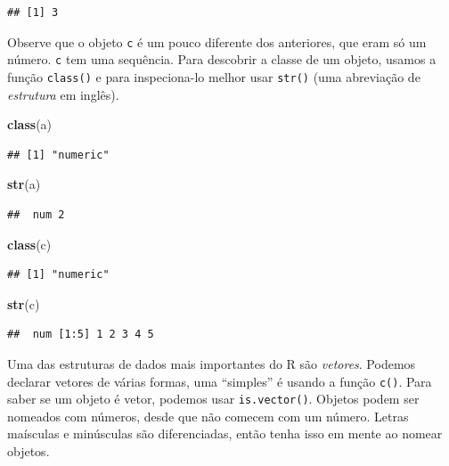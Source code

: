 \documentclass[
]{article}
\newenvironment{Shaded}{\begin{snugshade}}{\end{snugshade}}
\newcommand{\KeywordTok}[1]{\textcolor[rgb]{0.13,0.29,0.53}{\textbf{#1}}}
\newcommand{\NormalTok}[1]{#1}
\begin{document}
\begin{verbatim}
## [1] 3
\end{verbatim}

Observe que o objeto \texttt{c} é um pouco diferente dos anteriores, que
eram só um número. \texttt{c} tem uma sequência. Para descobrir a classe
de um objeto, usamos a função \texttt{class()} e para inspeciona-lo
melhor usar \texttt{str()} (uma abreviação de \emph{estrutura} em
inglês).

\begin{Shaded}
\begin{Highlighting}[]
\KeywordTok{class}\NormalTok{(a)}
\end{Highlighting}
\end{Shaded}

\begin{verbatim}
## [1] "numeric"
\end{verbatim}

\begin{Shaded}
\begin{Highlighting}[]
\KeywordTok{str}\NormalTok{(a)}
\end{Highlighting}
\end{Shaded}

\begin{verbatim}
##  num 2
\end{verbatim}

\begin{Shaded}
\begin{Highlighting}[]
\KeywordTok{class}\NormalTok{(c)}
\end{Highlighting}
\end{Shaded}

\begin{verbatim}
## [1] "numeric"
\end{verbatim}

\begin{Shaded}
\begin{Highlighting}[]
\KeywordTok{str}\NormalTok{(c)}
\end{Highlighting}
\end{Shaded}

\begin{verbatim}
##  num [1:5] 1 2 3 4 5
\end{verbatim}

Uma das estruturas de dados mais importantes do R são \emph{vetores}.
Podemos declarar vetores de várias formas, uma ``simples'' é usando a
função \texttt{c()}. Para saber se um objeto é vetor, podemos usar
\texttt{is.vector()}. Objetos podem ser nomeados com números, desde que
não comecem com um número. Letras maísculas e minúsculas são
diferenciadas, então tenha isso em mente ao nomear objetos.
\end{document}
